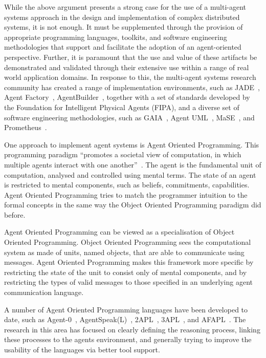 \documentclass[a4paper,12pt,oneside,fleqn]{book} %
\begin{document}
While the above argument presents a strong case for the use of a multi-agent
systems approach in the design and implementation of complex distributed
systems, it is not enough. It must be supplemented through the provision of
appropriate programming languages, toolkits, and software engineering
methodologies that support and facilitate the adoption of an agent-oriented
perspective. Further, it is paramount that the use and value of these artifacts
be demonstrated and validated through their extensive use within a range of
real world application domains. In response to this, the multi-agent systems
research community has created a range of implementation environments, such as
JADE~\cite{DBLP:books/sp/map2005/BellifemineBCP05}, Agent
Factory~\cite{collier1999agent}, AgentBuilder~\cite{},
together with a set of standards developed by the Foundation for
Intelligent Physical Agents (FIPA), and a diverse set of software engineering
methodologies, such as GAIA~\cite{DBLP:journals/aamas/WooldridgeJK00}, Agent
UML~\cite{bauer2001agent}, MaSE~\cite{deloach2001analysis}, and
Prometheus~\cite{DBLP:conf/atal/PadghamW02}.

One approach to implement agent systems is Agent Oriented Programming.
This programming paradigm ``promotes a societal view of computation, in
which multiple agents interact with one
another''~\cite{DBLP:journals/ai/Shoham93}.  The agent is the fundamental
unit of computation, analysed and controlled using mental terms.  The state
of an agent is restricted to mental components, such as beliefs,
commitments, capabilities. Agent Oriented Programming tries to match the
programmer intuition to the formal concepts in the same way the Object
Oriented Programming paradigm did before.

Agent Oriented Programming can be viewed as a specialisation of Object
Oriented Programming\null. Object Oriented Programming sees the
computational system as made of units, named objects, that are able to
communicate using messages. Agent Oriented Programming makes this framework
more specific by restricting the state of the unit to consist only of
mental components, and by restricting the types of valid messages to those
specified in an underlying agent communication language.

A number of Agent Oriented Programming languages have been developed to
date, such as Agent-0~\cite{DBLP:journals/ai/Shoham93},
AgentSpeak(L)~\cite{DBLP:conf/maamaw/Rao96},
2APL~\cite{DBLP:journals/aamas/Dastani08},
3APL~\cite{DBLP:conf/promas/DastaniRDM03}, and
AFAPL~\cite{DBLP:conf/seke/CollierOR04}. The research in this area has
focused on clearly defining the reasoning process, linking these processes
to the agents environment, and generally trying to improve the usability of
the languages via better tool support.
\end{document}
